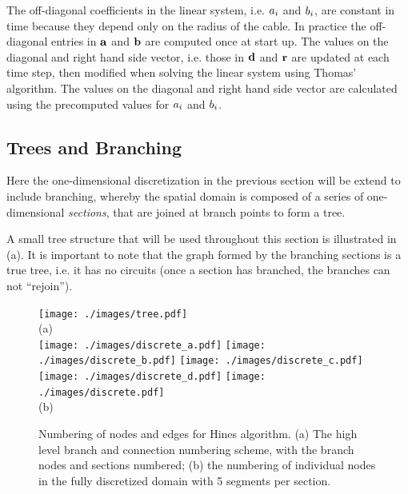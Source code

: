 The off-diagonal coefficients in the linear system, i.e. ${a}_{i}$ and ${b}_{i}$,  are constant in time because they depend only on the radius of the cable. In practice the off-diagonal entries in $\mathbf{a}$ and $\mathbf{b}$ are computed once at start up. The values on the diagonal and right hand side vector, i.e. those in $\mathbf{d}$ and $\mathbf{r}$ are updated at each time step, then modified when solving the linear system using Thomas' algorithm. The values on the diagonal and right hand side vector are calculated using the precomputed values for ${a}_{i}$ and ${b}_{i}$.
\subsection{Trees and Branching}
Here the one-dimensional discretization in the previous section will be extend to include branching, whereby the spatial domain is composed of a series of one-dimensional \emph{sections}, that are joined at branch points to form a tree.

A small tree structure that will be used throughout this section is illustrated in (a). It is important to note that the graph formed by the branching sections is a true tree, i.e. it has no circuits (once a section has branched, the branches can not ``rejoin'').

\begin{figure}[htp!]
\centering
\texttt{[image: ./images/tree.pdf]}
\\{\normalsize (a)}\\
\texttt{[image: ./images/discrete\_a.pdf]}
\texttt{[image: ./images/discrete\_b.pdf]}
\texttt{[image: ./images/discrete\_c.pdf]}
\texttt{[image: ./images/discrete\_d.pdf]}
\texttt{[image: ./images/discrete.pdf]}
\\{\normalsize (b)}
\caption{Numbering of nodes and edges for Hines algorithm. (a) The high level branch and connection numbering scheme, with the branch nodes and sections numbered; (b) the numbering of individual nodes in the fully discretized domain with 5 segments per section.}
\label{fig:tree}
\end{figure}


